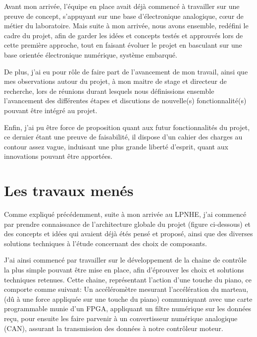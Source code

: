 \documentclass[french,a4paper,12pt]{report}
\begin{document}
	Avant mon arrivée, l'équipe en place avait déjà commencé à travailler sur une preuve de concept, s'appuyant sur une base d'électronique analogique, cœur de métier du laboratoire. Mais suite à mon arrivée, nous avons ensemble, redéfini le cadre du projet, afin de garder les idées et concepts testés et approuvés lors de cette première approche, tout en faisant évoluer le projet en basculant sur une base orientée électronique numérique, système embarqué.
	
	De plus, j'ai eu pour rôle de faire part de l'avancement de mon travail, ainsi que mes observations autour du projet, à mon maitre de stage et directeur de recherche, lors de réunions durant lesquels nous définissions ensemble l'avancement des différentes étapes et discutions de nouvelle(s) fonctionnalité(s) pouvant être intégré au projet.
	
	Enfin, j'ai pu être force de proposition quant aux futur fonctionnalités du projet, ce dernier étant une preuve de faisabilité, il dispose d'un cahier des charges au contour assez vague, induisant une plus grande liberté d'esprit, quant aux innovations pouvant être apportées.	
	
	
	\chapter{Les travaux menés}
	
	Comme expliqué précédemment, suite à mon arrivée au LPNHE, j'ai commencé par prendre connaissance de l'architecture globale du projet (figure ci-dessous) et des concepts et idées qui avaient déjà étés pensé et proposé, ainsi que des diverses solutions techniques à l'étude concernant des choix de composants.
	
	J'ai ainsi commencé par travailler sur le développement de la chaine de contrôle la plus simple pouvant être mise en place, afin d'éprouver les choix et solutions techniques retenues.
	Cette chaine, représentant l'action d'une touche du piano, ce comporte comme suivant: Un accéléromètre mesurant l'accélération du marteau, (dû à une force appliquée sur une touche du piano) communiquant avec une carte programmable munie d'un FPGA, appliquant un filtre numérique sur les données reçu, pour ensuite les faire parvenir à un convertisseur numérique analogique (CAN), assurant la transmission des données à notre contrôleur moteur.\newline
	
\end{document}
